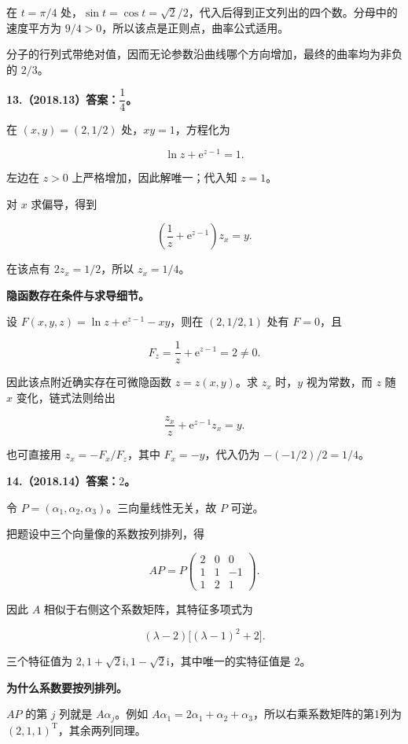 \documentclass[UTF8,11pt,fontset=windows]{ctexart}
\begin{document}
在 $t=\pi/4$ 处，$\sin t=\cos t=\sqrt2/2$，代入后得到正文列出的四个数。分母中的速度平方为 $9/4>0$，所以该点是正则点，曲率公式适用。

分子的行列式带绝对值，因而无论参数沿曲线哪个方向增加，最终的曲率均为非负的 $2/3$。

\clearpage

\textbf{13.（2018.13）答案：$\dfrac14$。}

在 $(x,y)=(2,1/2)$ 处，$xy=1$，方程化为

$$
\ln z+\mathrm e^{z-1}=1.
$$

左边在 $z>0$ 上严格增加，因此解唯一；代入知 $z=1$。

对 $x$ 求偏导，得到

$$
\left(\frac1z+\mathrm e^{z-1}\right)z_x=y.
$$

在该点有 $2z_x=1/2$，所以 $z_x=1/4$。

\textbf{隐函数存在条件与求导细节。}

设 $F(x,y,z)=\ln z+\mathrm e^{z-1}-xy$，则在 $(2,1/2,1)$ 处有 $F=0$，且

$$
F_z=\frac1z+\mathrm e^{z-1}=2\ne0.
$$

因此该点附近确实存在可微隐函数 $z=z(x,y)$。求 $z_x$ 时，$y$ 视为常数，而 $z$ 随 $x$ 变化，链式法则给出

$$
\frac{z_x}{z}+\mathrm e^{z-1}z_x=y.
$$

也可直接用 $z_x=-F_x/F_z$，其中 $F_x=-y$，代入仍为 $-(-1/2)/2=1/4$。

\clearpage

\textbf{14.（2018.14）答案：$2$。}

令 $P=(\alpha_1,\alpha_2,\alpha_3)$。三向量线性无关，故 $P$ 可逆。

把题设中三个向量像的系数按列排列，得

$$
AP=P\begin{pmatrix}2&0&0\\1&1&-1\\1&2&1\end{pmatrix}.
$$

因此 $A$ 相似于右侧这个系数矩阵，其特征多项式为

$$
(\lambda-2)\bigl[(\lambda-1)^2+2\bigr].
$$

三个特征值为 $2,1+\sqrt2\mathrm i,1-\sqrt2\mathrm i$，其中唯一的实特征值是 $2$。

\textbf{为什么系数要按列排列。}

$AP$ 的第 $j$ 列就是 $A\alpha_j$。例如 $A\alpha_1=2\alpha_1+\alpha_2+\alpha_3$，所以右乘系数矩阵的第1列为 $(2,1,1)^{\mathrm T}$，其余两列同理。
\end{document}
